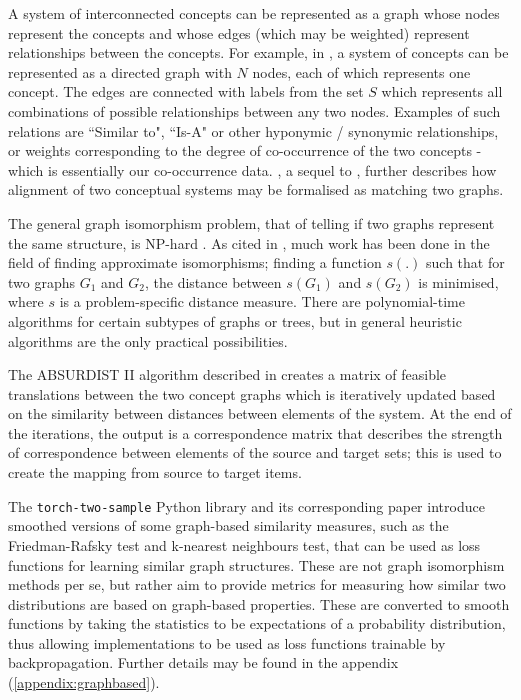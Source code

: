 A system of interconnected concepts can be represented as a graph whose nodes represent the concepts and whose edges (which may be weighted) represent relationships between the concepts. For example, in \cite{Absurdist2}, a system of concepts can be represented as a directed graph with $N$ nodes, each of which represents one concept. The edges are connected with labels from the set $S$ which represents all combinations of possible relationships between any two nodes. Examples of such relations are ``Similar to", ``Is-A" or other hyponymic / synonymic relationships, or weights corresponding to the degree of co-occurrence of the two concepts - which is essentially our co-occurrence data. \cite{Absurdist2}, a sequel to \cite{GOLDSTONE2002295}, further describes how alignment of two conceptual systems may be formalised as matching two graphs. 

The general graph isomorphism problem, that of telling if two graphs represent the same structure, is NP-hard \cite{GraphIsomorphismNPHard}. As cited in \cite{Absurdist2}, much work has been done in the field of finding approximate isomorphisms; finding a function $s(.)$ such that for two graphs $G_1$ and $G_2$, the distance between $s(G_1)$ and $s(G_2)$ is minimised, where $s$ is a problem-specific distance measure. There are polynomial-time algorithms for certain subtypes of graphs or trees, but in general heuristic algorithms are the only practical possibilities. 

The ABSURDIST II algorithm described in \cite{Absurdist2} creates a matrix of feasible translations between the two concept graphs which is iteratively updated based on the similarity between distances between elements of the system. At the end of the iterations, the output is a correspondence matrix that describes the strength of correspondence between elements of the source and target sets; this is used to create the mapping from source to target items. 

The \texttt{torch-two-sample} Python library and its corresponding paper \cite{torchtwosample} introduce smoothed versions of some graph-based similarity measures, such as the Friedman-Rafsky test and k-nearest neighbours test, that can be used as loss functions for learning similar graph structures. These are not graph isomorphism methods per se, but rather aim to provide metrics for measuring how similar two distributions are based on graph-based properties. These are converted to smooth functions by taking the statistics to be expectations of a probability distribution, thus allowing implementations to be used as loss functions trainable by backpropagation. Further details may be found in the appendix (\ref{appendix:graphbased}). 

